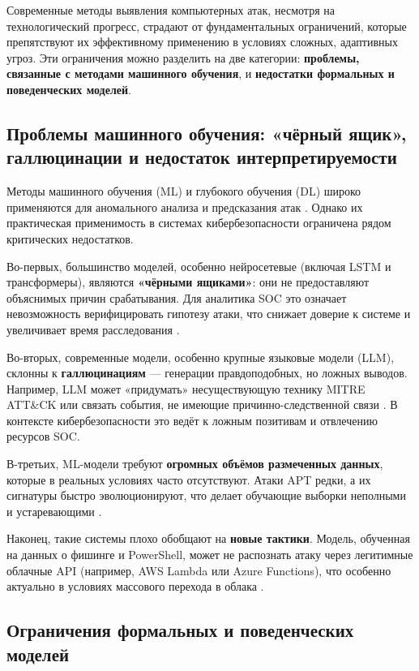 \documentclass{article}
\begin{document}
Современные методы выявления компьютерных атак, несмотря на технологический прогресс, страдают от фундаментальных ограничений, которые препятствуют их эффективному применению в условиях сложных, адаптивных угроз. Эти ограничения можно разделить на две категории: \textbf{проблемы, связанные с методами машинного обучения}, и \textbf{недостатки формальных и поведенческих моделей}.

\subsection{Проблемы машинного обучения: «чёрный ящик», галлюцинации и недостаток интерпретируемости}

Методы машинного обучения (ML) и глубокого обучения (DL) широко применяются для аномального анализа и предсказания атак \cite{Shu2018, Sommer2010}. Однако их практическая применимость в системах кибербезопасности ограничена рядом критических недостатков.

Во-первых, большинство моделей, особенно нейросетевые (включая LSTM и трансформеры), являются \textbf{«чёрными ящиками»}: они не предоставляют объяснимых причин срабатывания. Для аналитика SOC это означает невозможность верифицировать гипотезу атаки, что снижает доверие к системе и увеличивает время расследования \cite{Rudin2019}.

Во-вторых, современные модели, особенно крупные языковые модели (LLM), склонны к \textbf{галлюцинациям} — генерации правдоподобных, но ложных выводов. Например, LLM может «придумать» несуществующую технику MITRE ATT\&CK или связать события, не имеющие причинно-следственной связи \cite{Bommasani2021}. В контексте кибербезопасности это ведёт к ложным позитивам и отвлечению ресурсов SOC.

В-третьих, ML-модели требуют \textbf{огромных объёмов размеченных данных}, которые в реальных условиях часто отсутствуют. Атаки APT редки, а их сигнатуры быстро эволюционируют, что делает обучающие выборки неполными и устаревающими \cite{Ring2019}.

Наконец, такие системы плохо обобщают на \textbf{новые тактики}. Модель, обученная на данных о фишинге и PowerShell, может не распознать атаку через легитимные облачные API (например, AWS Lambda или Azure Functions), что особенно актуально в условиях массового перехода в облака \cite{MITRE2023}.

\subsection{Ограничения формальных и поведенческих моделей}
\end{document}
